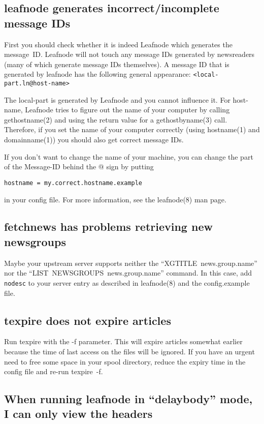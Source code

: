 \documentclass[10pt,english,a5paper]{article}
\begin{document}
\subsection{leafnode generates incorrect/incomplete message IDs}

   First you should check whether it is indeed Leafnode which generates
   the message~ID\@. Leafnode will not touch any message IDs generated by
   newsreaders (many of which generate message IDs themselves). A message
   ID that is generated by leafnode has the following general appearance:
   \verb+<local-part.ln@host-name>+

   The local-part is generated by Leafnode and you cannot influence it.
   For host-name, Leafnode tries to figure out the name of your computer
   by calling gethostname(2) and using the return value for a
   gethostbyname(3) call. Therefore, if you set the name of your computer
   correctly (using hostname(1) and domainname(1)) you should also get
   correct message IDs.

   If you don't want to change the name of your machine, you can change
   the part of the Message-ID behind the @ sign by putting
   \begin{verbatim}
hostname = my.correct.hostname.example
\end{verbatim} in your config file.
   For more information, see the leafnode(8) man page.

\subsection{fetchnews has problems retrieving new newsgroups}

   Maybe your upstream server supports neither the
   ``XGTITLE~news.group.name'' nor the
   ``LIST~NEWSGROUPS~news.group.name'' command. In
   this case, add \verb"nodesc" to your server entry as described in
   leafnode(8) and the config.example file.

\subsection{texpire does not expire articles}

   Run texpire with the -f parameter. This will expire articles somewhat
   earlier because the time of last access on the files will be ignored.
   If you have an urgent need to free some space in your spool directory,
   reduce the expiry time in the config file and re-run texpire~-f.

\subsection{When running leafnode in ``delaybody'' mode, I can only
view the headers}
\end{document}
